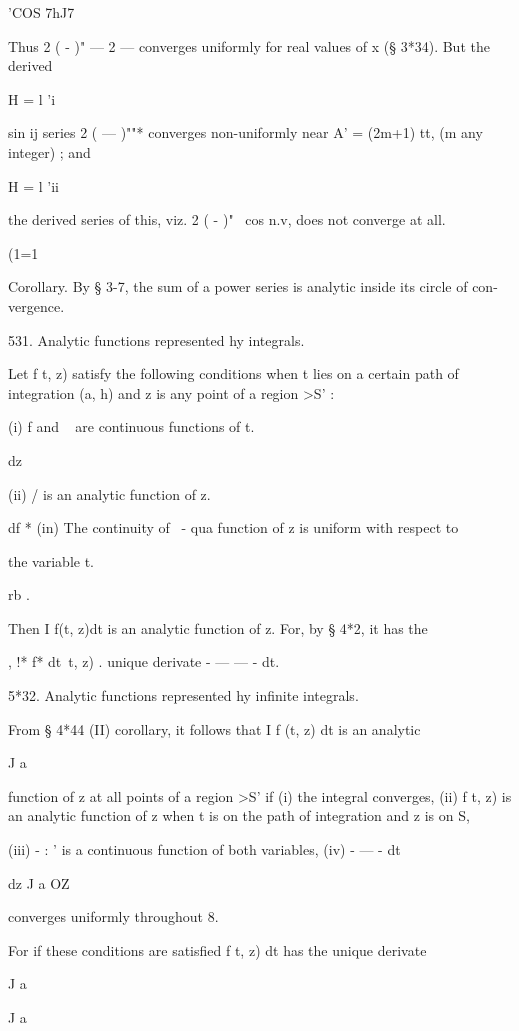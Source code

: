 {{'COS 7hJ7

Thus 2 ( - )" — 2 — converges uniformly for real values of x (§ 3*34).
But the derived

H = l 'i

  sin ij series 2 ( — )""* converges non-uniformly near A' = (2m+1)
tt, (m any integer) ; and

H = l 'ii

the derived series of this, viz. 2 ( - )"~ cos n.v, does not converge
at all.

(1=1

Corollary. By § 3-7, the sum of a power series is analytic inside its
circle of con- vergence.

531. Analytic functions represented hy integrals.

Let f t, z) satisfy the following conditions when t lies on a certain
path of integration (a, h) and z is any point of a region >S' :

(i) f and ~ are continuous functions of t.

   dz

(ii) / is an analytic function of z.

df * (in) The continuity of ~- qua function of z is uniform with
respect to

the variable t.

rb .

Then I f(t, z)dt is an analytic function of z. For, by § 4*2, it has
the

, !* f* dt\ t, z) . unique derivate - — — - dt.

5*32. Analytic functions represented hy infinite integrals.

From § 4*44 (II) corollary, it follows that I f (t, z) dt is an
analytic

J a

function of z at all points of a region >S' if (i) the integral
converges, (ii) f t, z) is an analytic function of z when t is on the
path of integration and z is on S,

(iii) - : ' is a continuous function of both variables, (iv) - — - dt

dz J a OZ

converges uniformly throughout 8.

For if these conditions are satisfied f t, z) dt has the unique
derivate

J a



J a



}}
